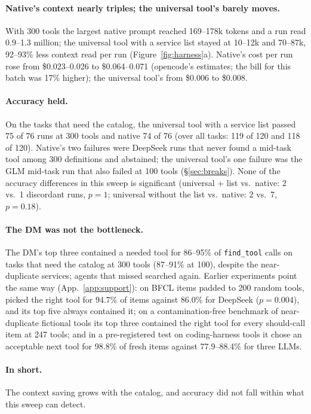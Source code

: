 \paragraph{Native's context nearly triples; the universal tool's barely moves.} With 300 tools the largest native
prompt reached 169--178k tokens and a run read 0.9--1.3 million; the universal tool with a service list stayed
at 10--12k and 70--87k, 92--93\% less context read per run (Figure~\ref{fig:harness}a). Native's cost per run rose from
\$0.023--0.026 to \$0.064--0.071 (opencode's estimates; the bill for this batch was 17\% higher); the universal tool's from \$0.006 to \$0.008.

\paragraph{Accuracy held.} On the tasks that need the catalog, the universal tool with a service list passed 75 of 76 runs
at 300 tools and native 74 of 76 (over all tasks: 119 of 120 and 118 of 120). Native's two failures were DeepSeek
runs that never found a mid-task tool among 300 definitions and abstained; the universal tool's one failure
was the GLM mid-task run that also failed at 100 tools (\S\ref{sec:breaks}). None of the accuracy differences
in this sweep is significant (universal + list vs.\ native: 2 vs.\ 1 discordant runs, $p=1$; universal without
the list vs.\ native: 2 vs.\ 7, $p=0.18$).

\paragraph{The DM was not the bottleneck.} The DM's top three contained a needed tool for 86--95\% of \texttt{find\_tool} calls on tasks that need the catalog at 300
tools (87--91\% at 100), despite the near-duplicate services; agents that missed searched again. Earlier
experiments point the same way (App.~\ref{app:support}): on BFCL items padded to 200 random tools, \msd{} picked
the right tool for 94.7\% of items against 86.0\% for DeepSeek ($p=0.004$), and its top five always contained
it; on a contamination-free benchmark of near-duplicate fictional tools its top three contained the right tool
for every should-call item at 247 tools; and in a pre-registered test on coding-harness tools it chose an acceptable next
tool for 98.8\% of fresh items against 77.9--88.4\% for three LLMs.

\paragraph{In short.} The context saving grows with the catalog, and accuracy did not fall within what this
sweep can detect.

